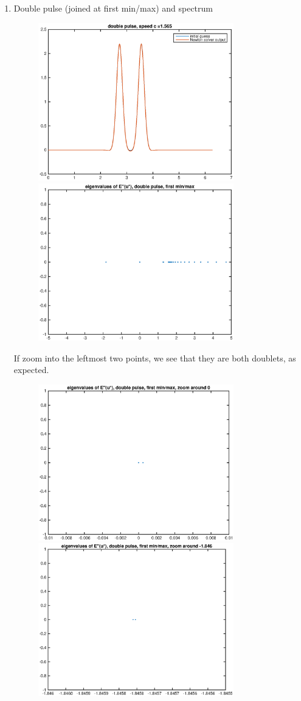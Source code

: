 \documentclass[12pt]{article}
\begin{document}
\begin{enumerate}
	\item Double pulse (joined at first min/max) and spectrum
	\begin{figure}[H]
	\includegraphics[width=8.5cm]{fourierdoublepulse1.eps}
	\includegraphics[width=8.5cm]{intEigs2.eps}
	\end{figure}
	If zoom into the leftmost two points, we see that they are both doublets, as expected.
	\begin{figure}[H]
	\includegraphics[width=8.5cm]{intEigs2Zoom1.eps}
	\includegraphics[width=8.5cm]{intEigs2Zoom2.eps}
	\end{figure}
\end{enumerate}
\end{document}
